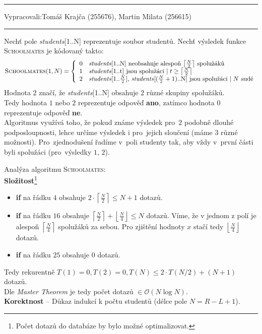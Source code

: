 \documentclass[12pt]{article}
\newcommand{\move}{\rightarrow}
\newcommand{\var}[1]{\textit{#1}}
\newcommand{\zadani}[2]{
{\large
\noindent {\bf IB108 \hfill{} Sada #1, Příklad #2 \\[-4mm]}
\noindent\hrule
\vspace{2mm}
\noindent Vypracovali:\hfill{}Tomáš Krajča (255676), Martin Milata (256615)
\vspace{3mm}
\hrule
\bigskip\bigskip}
}
\begin{document}
\zadani{2}{1}

\noindent
Nechť pole \var{students}[1..N] reprezentuje soubor studentů.
Nechť výsledek funkce \textsc{Schoolmates} je kódovaný takto:
\begin{equation*}
\textsc{Schoolmates}(1,N) = \left\{
	\begin{array}{rl}
	0 & \text{\var{students}[1..N] neobsahuje alespoň $\left\lceil \frac{N}{2}
	\right\rceil$ spolužáků}\\
	1 & \text{\var{students}[1..t] jsou spolužáci $\mid t \geq \left\lceil \frac{N}{2}
	\right\rceil$}\\
	2 & \text{\var{students}[1..$\frac{N}{2}
	$], \var{students}[$(\frac{N}{2}
	+1)$..N] jsou
	spolužáci $\mid N$ sudé}
	\end{array} \right.
\end{equation*}
Hodnota $2$ značí, že \var{students}[1..N] obsahuje $2$ různé skupiny
spolužáků.\\
Tedy hodnota $1$ nebo $2$ reprezentuje odpověď \textbf{ano}, zatímco hodnota $0$
reprezentuje odpověď \textbf{ne}.\\
Algoritmus využívá toho, že pokud známe výsledek pro~$2$ podobně dlouhé
podposloupnosti, lehce určíme výsledek i pro~jejich sloučení (máme $3$ různé
možnosti). Pro~zjednodušení řadíme v~poli studenty tak, aby vždy v~první části byli
spolužáci (pro~výsledky $1$, $2$).

\bigskip
\noindent
Analýza algoritmu \textsc{Schoolmates}:\\
\textbf{Složitost}\footnote{Počet dotazů do databáze by bylo možné optimalizovat.}
\begin{itemize}
\item \textbf{if} na řádku $4$ obsahuje $2\cdot\left\lceil\frac{N}{2}\right\rceil \leq
N+1$ dotazů.
\item \textbf{if} na řádku $16$ obsahuje $\left\lceil\frac{N}{2}\right\rceil +
\left\lfloor\frac{N}{4}\right\rfloor \leq N$ dotazů. Víme, že v jednom z polí je
alespoň $\left\lceil\frac{N}{4}\right\rceil$ spolužáků za sebou. Pro zjištění
hodnoty $x$ stačí tedy $\left\lfloor\frac{N}{4}\right\rfloor$ dotazů.
\item \textbf{if} na řádku $25$ obsahuje $0$ dotazů.
\end{itemize}
Tedy rekurentně $T(1) = 0, T(2) = 0, T(N) \leq 2\cdot T(N/2) + (N+1)$ dotazů.\\
Dle \textit{Master Theorem} je tedy počet dotazů $\in \mathcal{O}(N\log N)$.\\
\textbf{Korektnost} -- Důkaz indukcí k počtu studentů (délce pole $N = R - L + 1$).
\end{document}
